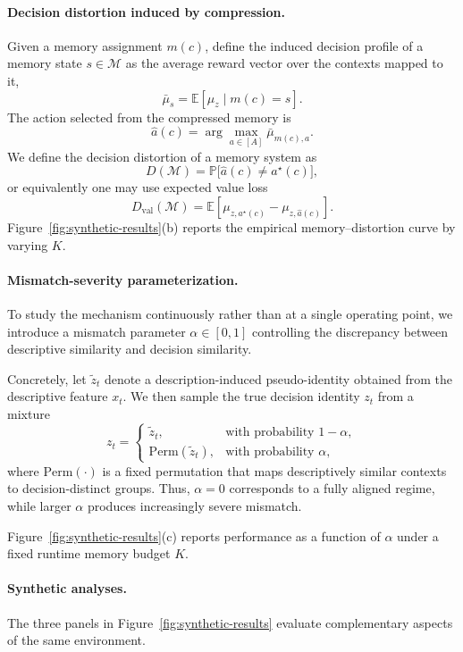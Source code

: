 \documentclass{article}
\theoremstyle{plain}
\theoremstyle{definition}
\theoremstyle{remark}
\begin{document}
\paragraph{Decision distortion induced by compression.}
Given a memory assignment \(m(c)\), define the induced decision profile of a memory state \(s\in\mathcal{M}\) as the average reward vector over the contexts mapped to it,
\[
\bar{\mu}_s = \mathbb{E}\!\left[\mu_{z} \mid m(c)=s\right].
\]
The action selected from the compressed memory is
\[
\hat{a}(c)=\arg\max_{a\in[A]} \bar{\mu}_{m(c),a}.
\]
We define the decision distortion of a memory system as
\[
D(\mathcal{M}) = \mathbb{P}\!\bigl[\hat{a}(c) \neq a^\star(c)\bigr],
\]      
or equivalently one may use expected value loss
\[
D_{\mathrm{val}}(\mathcal{M}) 
= \mathbb{E}\!\left[\mu_{z,a^\star(c)} - \mu_{z,\hat{a}(c)}\right].
\]
Figure~\ref{fig:synthetic-results}(b) reports the empirical memory--distortion curve by varying \(K\).
\paragraph{Mismatch-severity parameterization.}
To study the mechanism continuously rather than at a single operating point, we introduce a mismatch parameter \(\alpha \in [0,1]\) controlling the discrepancy between descriptive similarity and decision similarity.

Concretely, let \(\tilde{z}_t\) denote a description-induced pseudo-identity obtained from the descriptive feature \(x_t\). 
We then sample the true decision identity \(z_t\) from a mixture
\[
z_t =
\begin{cases}
\tilde{z}_t, & \text{with probability } 1-\alpha,\\
\mathrm{Perm}(\tilde{z}_t), & \text{with probability } \alpha,
\end{cases}
\]
where \(\mathrm{Perm}(\cdot)\) is a fixed permutation that maps descriptively similar contexts to decision-distinct groups. 
Thus, \(\alpha=0\) corresponds to a fully aligned regime, while larger \(\alpha\) produces increasingly severe mismatch.

Figure~\ref{fig:synthetic-results}(c) reports performance as a function of \(\alpha\) under a fixed runtime memory budget \(K\).
\paragraph{Synthetic analyses.}
The three panels in Figure~\ref{fig:synthetic-results} evaluate complementary aspects of the same environment.
\end{document}

